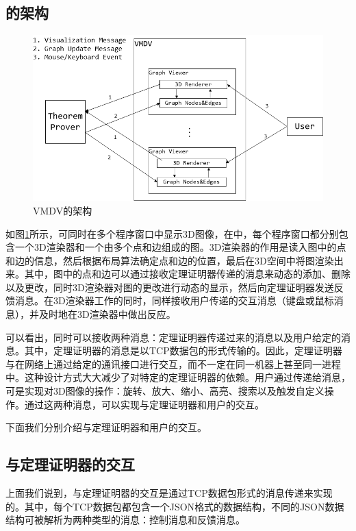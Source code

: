 \subsection{的架构}
\begin{figure}[!h]
	\scriptsize
	\centering
	\includegraphics[width=12cm]{./Img/architecture.png}
	\caption{\textsf{VMDV}的架构}
	\label{fig:architecture}
\end{figure}
如图\ref{fig:architecture}所示，可同时在多个程序窗口中显示3D图像，在中，每个程序窗口都分别包含一个3D渲染器和一个由多个点和边组成的图。3D渲染器的作用是读入图中的点和边的信息，然后根据布局算法确定点和边的位置，最后在3D空间中将图渲染出来。其中，图中的点和边可以通过接收定理证明器传递的消息来动态的添加、删除以及更改，同时3D渲染器对图的更改进行动态的显示，然后向定理证明器发送反馈消息。在3D渲染器工作的同时，同样接收用户传递的交互消息（键盘或鼠标消息），并及时地在3D渲染器中做出反应。

可以看出，同时可以接收两种消息：定理证明器传递过来的消息以及用户给定的消息。其中，定理证明器的消息是以\textsf{TCP}数据包的形式传输的。因此，定理证明器与在网络上通过给定的通讯接口进行交互，而不一定在同一机器上甚至同一进程中。这种设计方式大大减少了对特定的定理证明器的依赖。用户通过传递给消息，可是实现对3D图像的操作：旋转、放大、缩小、高亮、搜索以及触发自定义操作。通过这两种消息，可以实现与定理证明器和用户的交互。

下面我们分别介绍与定理证明器和用户的交互。
\subsection{与定理证明器的交互}
上面我们说到，与定理证明器的交互是通过\textsf{TCP}数据包形式的消息传递来实现的。其中，每个\textsf{TCP}数据包都包含一个\textsf{JSON}格式的数据结构，不同的\textsf{JSON}数据结构可被解析为两种类型的消息：控制消息和反馈消息。

